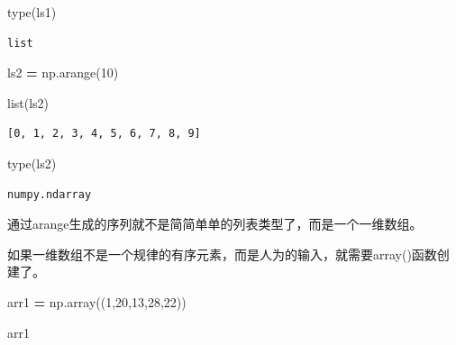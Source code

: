 \documentclass[]{article}
\newenvironment{Shaded}{\begin{snugshade}}{\end{snugshade}}
\newcommand{\DecValTok}[1]{\textcolor[rgb]{0.00,0.00,0.81}{#1}}
\newcommand{\OperatorTok}[1]{\textcolor[rgb]{0.81,0.36,0.00}{\textbf{#1}}}
\newcommand{\BuiltInTok}[1]{#1}
\newcommand{\NormalTok}[1]{#1}
\begin{document}
\begin{Shaded}
\begin{Highlighting}[]
\BuiltInTok{type}\NormalTok{(ls1)}
\end{Highlighting}
\end{Shaded}

\begin{verbatim}
list
\end{verbatim}

\begin{Shaded}
\begin{Highlighting}[]
\NormalTok{ls2 }\OperatorTok{=}\NormalTok{ np.arange(}\DecValTok{10}\NormalTok{)}
\end{Highlighting}
\end{Shaded}

\begin{Shaded}
\begin{Highlighting}[]
\BuiltInTok{list}\NormalTok{(ls2)}
\end{Highlighting}
\end{Shaded}

\begin{verbatim}
[0, 1, 2, 3, 4, 5, 6, 7, 8, 9]
\end{verbatim}

\begin{Shaded}
\begin{Highlighting}[]
\BuiltInTok{type}\NormalTok{(ls2)}
\end{Highlighting}
\end{Shaded}

\begin{verbatim}
numpy.ndarray
\end{verbatim}

通过arange生成的序列就不是简简单单的列表类型了，而是一个一维数组。

如果一维数组不是一个规律的有序元素，而是人为的输入，就需要array()函数创建了。

\begin{Shaded}
\begin{Highlighting}[]
\NormalTok{arr1 }\OperatorTok{=}\NormalTok{ np.array((}\DecValTok{1}\NormalTok{,}\DecValTok{20}\NormalTok{,}\DecValTok{13}\NormalTok{,}\DecValTok{28}\NormalTok{,}\DecValTok{22}\NormalTok{))}
\end{Highlighting}
\end{Shaded}

\begin{Shaded}
\begin{Highlighting}[]
\NormalTok{arr1}
\end{Highlighting}
\end{Shaded}
\end{document}
